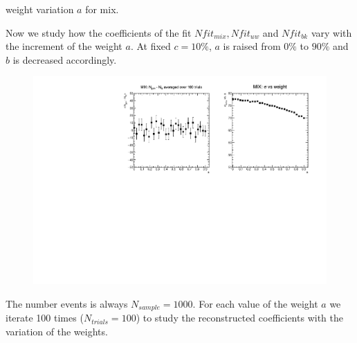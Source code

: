 \documentclass[9pt]{beamer}
\begin{document}
\begin{frame}{weight variation $a$ for mix.}

Now we study how the coefficients of the fit $Nfit_{mix}, Nfit_{uw}$ and $Nfit_{bk}$ vary with the increment of the weight $a$. 
At fixed $c = 10\%$, $a$ is raised from $0\%$ to $90\%$ and $b$ is decreased accordingly. 

\begin{figure}
\vspace{-7pt}
\includegraphics[width = 1\textwidth , valign = t]{N1000/Nmix_and_Sigma(90,0,10).pdf}
\end{figure}
The number events is always $ N_{sample} = 1000$. For each value of the weight $a$  we\\ iterate 100 times ($N_{trials} = 100$) to study the reconstructed coefficients with the \\ variation of the weights.
\end{frame}
\end{document}
